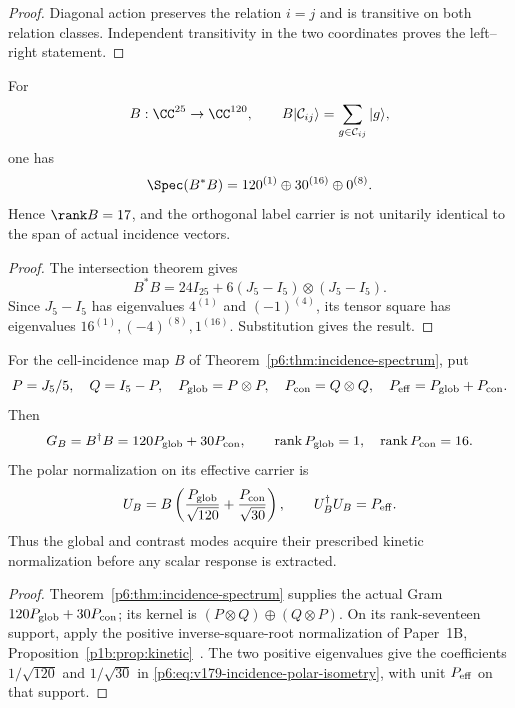 \documentclass[12pt,a4paper]{article}
\begin{document}
\begin{proof}
Diagonal action preserves the relation \(i=j\) and is transitive on both
relation classes.  Independent transitivity in the two coordinates proves
the left--right statement.
\end{proof}

\begin{theorem}
\label{p6:thm:incidence-spectrum}
For
\[
B:\CC^{25}\to\CC^{120},
\qquad
B|\mathcal C_{ij}\rangle
=\sum_{g\in\mathcal C_{ij}}|g\rangle,
\]
one has
\[
\Spec(B^*B)=120^{(1)}\oplus30^{(16)}\oplus0^{(8)}.
\]
Hence \(\rank B=17\), and the orthogonal label carrier is not unitarily
identical to the span of actual incidence vectors.
\end{theorem}

\begin{proof}
The intersection theorem gives
\[
B^*B=24I_{25}+6(J_5-I_5)\otimes(J_5-I_5).
\]
Since \(J_5-I_5\) has eigenvalues \(4^{(1)}\) and \((-1)^{(4)}\), its
tensor square has eigenvalues \(16^{(1)},(-4)^{(8)},1^{(16)}\).  Substitution
gives the result.
\end{proof}

\begin{theorem}
\label{p6:thm:v179-incidence-polar-normalization}
For the cell-incidence map \(B\) of
Theorem~\ref{p6:thm:incidence-spectrum}, put
\[
 P=J_5/5,\quad Q=I_5-P,\quad
 P_{\rm glob}=P\otimes P,\quad P_{\rm con}=Q\otimes Q,\quad
 P_{\rm eff}=P_{\rm glob}+P_{\rm con}.
\]
Then
\[
 G_B=B^\dagger B=120P_{\rm glob}+30P_{\rm con},
 \qquad \operatorname{rank}P_{\rm glob}=1,\quad
 \operatorname{rank}P_{\rm con}=16.
\]
The polar normalization on its effective carrier is
\begin{equation}
\label{p6:eq:v179-incidence-polar-isometry}
 U_B=B\left(\frac{P_{\rm glob}}{\sqrt{120}}
           +\frac{P_{\rm con}}{\sqrt{30}}\right),\qquad
 U_B^\dagger U_B=P_{\rm eff}.
\end{equation}
Thus the global and contrast modes acquire their prescribed kinetic
normalization before any scalar response is extracted.
\end{theorem}
\begin{proof}
Theorem~\ref{p6:thm:incidence-spectrum} supplies the actual Gram
$120P_{\rm glob}+30P_{\rm con}$; its kernel is
$(P\otimes Q)\oplus(Q\otimes P)$. On its rank-seventeen support,
apply the positive inverse-square-root normalization of Paper~1B,
Proposition~\ref{p1b:prop:kinetic}~\cite{Kugelmann2026Paper1B}.
The two positive eigenvalues give the coefficients $1/\sqrt{120}$ and
$1/\sqrt{30}$ in \eqref{p6:eq:v179-incidence-polar-isometry}, with unit
$P_{\rm eff}$ on that support.
\end{proof}
\end{document}
